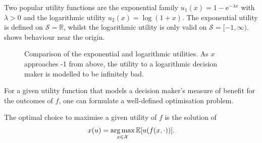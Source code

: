 \documentclass[main.tex]{subfiles}
\begin{document}
\begin{example}
  Two popular utility functions are the exponential family
  $u_1(x)=1-\mathrm{e}^{-\lambda x}$ with $\lambda>0$ and the logarithmic
  utility $u_2(x)=\log(1+x)$.
  The exponential utility is defined on $\mathcal S =\mathbb R$,
  whilst the logarithmic utility is only valid on $\mathcal
  S=[-1,\infty)$.
   shows behaviour near the origin.
  \begin{figure}[htbp]
    \centering
    \caption{Comparison of the exponential and logarithmic
      utilities. As $x$ approaches -1 from above, the utility to a logarithmic
      decision maker is modelled to be infinitely bad.
    }\label{fig:example_utilities}
  \end{figure}
\end{example}

For a given utility function that models a decision maker's measure of
benefit for the outcomes of $f$, one can formulate a well-defined
optimisation problem.

\begin{problem}
  The optimal choice to maximise a given utility of $f$ is the
  solution of
  \begin{align}
    x(u)=\operatorname*{arg\,max}_{x\in\mathcal{X}} \mathbb E[u(f(x,\cdot))].
  \end{align}
\end{problem}
\end{document}
